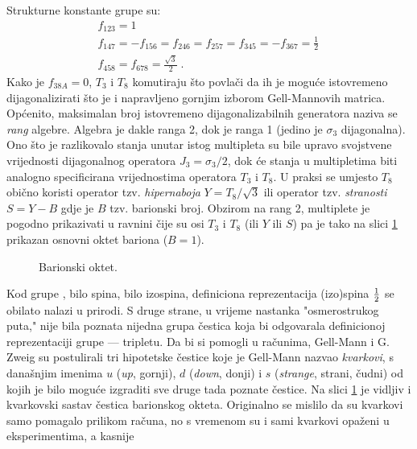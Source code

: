 Strukturne konstante grupe  su:
\begin{gather}
f_{123} = 1 \, \nonumber \\
f_{147} = -f_{156} = f_{246} = f_{257} = f_{345} = -f_{367} = \frac{1}{2} \, \\
f_{458} = f_{678} = \frac{\sqrt{3}}{2} \;. \nonumber
\end{gather}
Kako je $f_{38A}=0$, $T_3$ i $T_8$ komutiraju što povlači da ih je moguće
istovremeno dijagonalizirati što je i napravljeno gornjim izborom
Gell-Mannovih matrica.
Općenito, maksimalan broj istovremeno dijagonalizabilnih generatora naziva se 
\emph{rang} algebre. 
Algebra  je dakle ranga 2, dok je  ranga 1 (jedino je $\sigma_3$ dijagonalna).
Ono što je razlikovalo stanja unutar istog  multipleta su bile upravo
svojstvene vrijednosti dijagonalnog operatora $J_3 = \sigma_3/2$, dok
će stanja u  multipletima biti analogno specificirana vrijednostima
operatora $T_3$ i $T_8$. U praksi se umjesto $T_8$ obično koristi
operator tzv. \emph{hipernaboja} $Y = T_8/\sqrt{3}$ ili operator tzv.
\emph{stranosti} $S = Y - B$ gdje je $B$ tzv. barionski broj. 
   
Obzirom na rang 2,  multiplete je pogodno prikazivati u ravnini
čije su osi $T_3$ i $T_8$ (ili $Y$ ili $S$) pa je tako na slici
\ref{fig:baryon_octet} prikazan osnovni oktet bariona ($B=1$).
\begin{figure}[ht]
\begin{center}

\end{center}
\caption{Barionski oktet. }
\label{fig:baryon_octet}
\end{figure}
Kod grupe , bilo spina, bilo izospina, definiciona reprezentacija
(izo)spina $\frac{1}{2}$ se obilato nalazi u prirodi. S druge strane,
u vrijeme nastanka "osmerostrukog puta," nije bila poznata nijedna
grupa čestica koja bi odgovarala definicionoj reprezentaciji grupe
 --- tripletu. Da bi si pomogli u računima, Gell-Mann i
G. Zweig su postulirali tri hipotetske čestice koje je Gell-Mann nazvao
\emph{kvarkovi}, s današnjim imenima $u$ (\emph{up}, gornji), $d$
(\emph{down}, donji) i $s$ (\emph{strange}, strani, čudni) od kojih
je bilo moguće izgraditi sve druge tada poznate čestice. Na slici
\ref{fig:baryon_octet} je vidljiv i kvarkovski sastav čestica barionskog
okteta.
Originalno se mislilo da su kvarkovi samo pomagalo prilikom računa,
no s vremenom su i sami kvarkovi opaženi u eksperimentima, a kasnije
